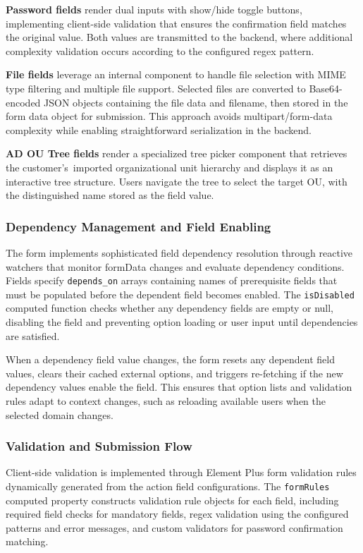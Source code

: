 \textbf{Password fields} render dual inputs with show/hide toggle buttons, implementing client-side validation that ensures the confirmation field matches the original value. Both values are transmitted to the backend, where additional complexity validation occurs according to the configured regex pattern.

\textbf{File fields} leverage an internal component to handle file selection with MIME type filtering and multiple file support. Selected files are converted to Base64-encoded JSON objects containing the file data and filename, then stored in the form data object for submission. This approach avoids multipart/form-data complexity while enabling straightforward serialization in the backend.

\textbf{AD OU Tree fields} render a specialized tree picker component that retrieves the customer's~imported organizational unit hierarchy and displays it as an interactive tree structure. Users navigate the tree to select the target OU, with the distinguished name stored as the field value.

\subsubsection{Dependency Management and Field Enabling}

The form implements sophisticated field dependency resolution through reactive watchers that monitor formData changes and evaluate dependency conditions. Fields specify \texttt{depends\_on} arrays containing names of prerequisite fields that must be populated before the dependent field becomes enabled. The \texttt{isDisabled} computed function checks whether any dependency fields are empty or null, disabling the field and preventing option loading or user input until dependencies are satisfied.

When a dependency field value changes, the form resets any dependent field values, clears their cached external options, and triggers re-fetching if the new dependency values enable the field. This ensures that option lists and validation rules adapt to context changes, such as reloading available users when the selected domain changes.

\subsubsection{Validation and Submission Flow}

Client-side validation is implemented through Element Plus form validation rules dynamically generated from the action field configurations. The \texttt{formRules} computed property constructs validation rule objects for each field, including required field checks for mandatory fields, regex validation using the configured patterns and error messages, and custom validators for password confirmation matching.


